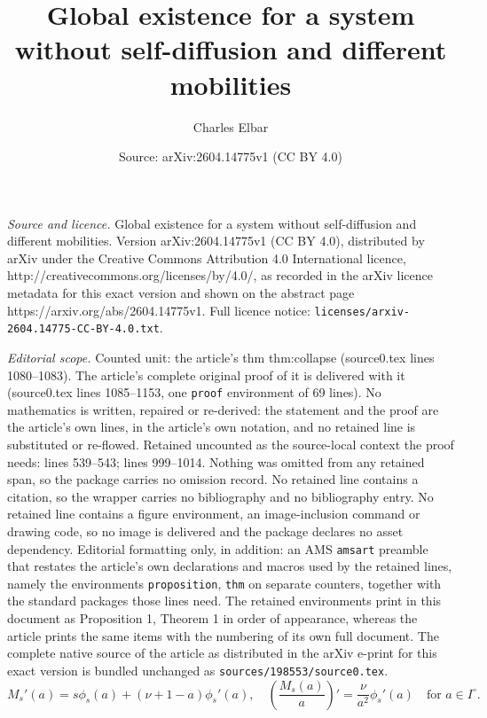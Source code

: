 \documentclass[10pt,a4paper]{amsart}
\title{Global existence for a system without self-diffusion and different mobilities}
\author{Charles Elbar}
\date{Source: arXiv:2604.14775v1 (CC BY 4.0)}
\begin{document}
\maketitle

\noindent\emph{Source and licence.} Global existence for a system without self-diffusion and different mobilities. Version arXiv:2604.14775v1 (CC BY 4.0), distributed by arXiv under the Creative Commons Attribution 4.0 International licence, http://creativecommons.org/licenses/by/4.0/, as recorded in the arXiv licence metadata for this exact version and shown on the abstract page https://arxiv.org/abs/2604.14775v1. Full licence notice: \texttt{licenses/arxiv-2604.14775-CC-BY-4.0.txt}.\par\smallskip

\noindent\textit{Editorial scope.} Counted unit: the article's thm thm:collapse (source0.tex lines 1080--1083). The article's complete original proof of it is delivered with it (source0.tex lines 1085--1153, one \texttt{proof} environment of 69 lines). No mathematics is written, repaired or re-derived: the statement and the proof are the article's own lines, in the article's own notation, and no retained line is substituted or re-flowed.  Retained uncounted as the source-local context the proof needs: lines 539--543; lines 999--1014.  Nothing was omitted from any retained span, so the package carries no omission record.  No retained line contains a citation, so the wrapper carries no bibliography and no bibliography entry.  No retained line contains a figure environment, an image-inclusion command or drawing code, so no image is delivered and the package declares no asset dependency.  Editorial formatting only, in addition: an AMS \texttt{amsart} preamble that restates the article's own declarations and macros used by the retained lines, namely the environments \texttt{proposition}, \texttt{thm} on separate counters, together with the standard packages those lines need.  The retained environments print in this document as Proposition 1, Theorem 1 in order of appearance, whereas the article prints the same items with the numbering of its own full document.  The complete native source of the article as distributed in the arXiv e-print for this exact version is bundled unchanged as \texttt{sources/198553/source0.tex}.
\begin{equation}
\label{eq:Ma-derivative}
M_s'(a)=s\phi_s(a)+(\nu+1-a)\phi_s'(a), \quad \left(\frac{M_s(a)}{a}\right)'=\frac{\nu}{a^2}\phi_s'(a)
 \quad \text{for } a\in I^\circ.
\end{equation}
\end{document}
